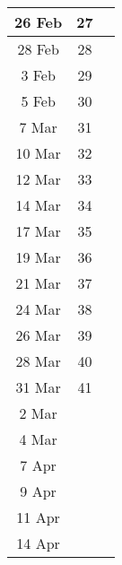 \documentclass{article}
\begin{document}
\begin{center}
\begin{tabular}{|c|c|c|}
    26 Feb & 27    &                                     \\ \hline
    28 Feb & 28    &                                     \\ \hline
     3 Feb & 29    &                                     \\ \hline
     5 Feb & 30    &                                     \\ \hline
     7 Mar & 31    &                                     \\ \hline
    10 Mar & 32    &                                     \\ \hline
    12 Mar & 33    &                                     \\ \hline
    14 Mar & 34    &                                     \\ \hline
    17 Mar & 35    &                                     \\ \hline
    19 Mar & 36    &                                     \\ \hline
    21 Mar & 37    &                                     \\ \hline
    24 Mar & 38    &                                     \\ \hline
    26 Mar & 39    &                                     \\ \hline
    28 Mar & 40    &                                     \\ \hline
    31 Mar & 41    &                                     \\ \hline
     2 Mar &       &                                     \\ \hline
     4 Mar &       &                                     \\ \hline
     7 Apr &       &                                     \\ \hline
     9 Apr &       &                                     \\ \hline
    11 Apr &       &                                     \\ \hline
    14 Apr &       &                                     \\ \hline 
  \end{tabular}
\end{center}
\end{document}
